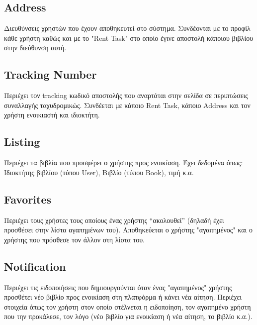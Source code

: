 \documentclass[12pt,a4paper]{article}
\begin{document}
\subsection{Address}
Διευθύνσεις χρηστών που έχουν αποθηκευτεί στο σύστημα. Συνδέονται με το προφίλ κάθε χρήστη καθώς και με το "Rent Task" στο οποίο έγινε αποστολή κάποιου βιβλίου στην διεύθυνση αυτή.

\subsection{Tracking Number}
Περιέχει τον tracking κωδικό αποστολής που αναρτάται στην σελίδα σε περιπτώσεις συναλλαγής ταχυδρομικώς. Συνδέεται με κάποιο Rent Task, κάποιο Address και τον χρήστη ενοικιαστή και ιδιοκτήτη.

\subsection{Listing}
Περιέχει τα βιβλία που προσφέρει ο χρήστης προς ενοικίαση. Έχει δεδομένα όπως: Ιδιοκτήτης βιβλίου (τύπου User), Βιβλίο (τύπου Book), τιμή κ.α.

\subsection{Favorites}
Περιέχει τους χρήστες τους οποίους ένας χρήστης “ακολουθεί” (δηλαδή έχει προσθέσει στην λίστα αγαπημένων του). Αποθηκεύεται ο χρήστης "αγαπημένος" και ο χρήστης που πρόσθεσε τον άλλον στη λίστα του.

\subsection{Notification}
Περιέχει τις ειδοποιήσεις που δημιουργούνται όταν ένας "αγαπημένος" χρήστης προσθέτει νέο βιβλίο προς ενοικίαση στη πλατφόρμα ή κάνει νέα αίτηση. Περιέχει στοιχεία όπως τον χρήστη στον οποίο στέλνεται η ειδοποίηση, τον αγαπημένο χρήστη που την προκάλεσε, τον λόγο (νέο βιβλίο για ενοικίαση ή νέα αίτηση, το βιβλίο κ.α.).
\end{document}

